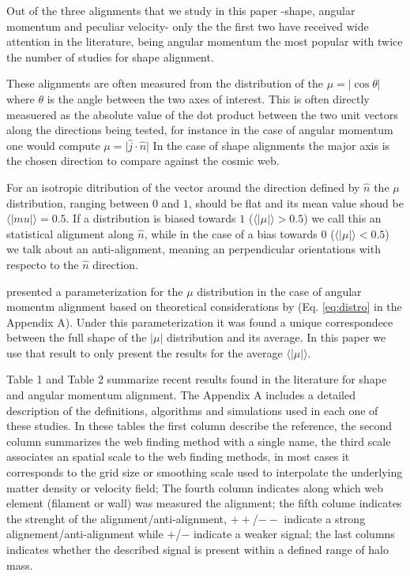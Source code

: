 \documentclass[useAMS,usenatbib]{mn2e}
\begin{document}
Out of the three alignments that we study in this paper -shape,
angular momentum and peculiar velocity- only the the first two have
received wide attention in the literature, being angular momentum the
most popular with twice the number of studies for shape alignment.

These alignments are often measured from the distribution of the
$\mu=\vert\cos\theta\vert$ where $\theta$ is the angle between the two axes of
interest. This is often directly measuered as the absolute value of
the dot product between the two unit vectors along the directions
being tested, for instance in the case of angular momentum one would compute
$\mu=\vert\hat{j}\cdot\hat{n}\vert$ In the case of shape alignments the major
axis is the chosen direction to compare against the cosmic web. 

For an isotropic ditribution of the vector around the direction defined by
$\hat{n}$ the $\mu$ distribution, ranging between $0$ and $1$, should
be flat and its mean value shoud be
$\langle|mu|\rangle=0.5$. If a distribution is biased towards $1$
($\langle\vert\mu\vert\rangle>0.5$) we call this an statistical
alignment along $\hat{n}$, while in the case of a bias towards $0$
($\langle\vert\mu\vert\rangle<0.5$) we talk about an anti-alignment,
meaning an perpendicular orientations with respecto to the $\hat{n}$
direction. 

\cite{Trowland2013} presented a parameterization for the $\mu$
distribution in the case of angular momentm alignment based on
theoretical considerations by \cite{Lee2005} (Eq. \ref{eq:distro} in
the Appendix A). Under this parameterization it was found a unique
correspondece between the full shape of the $\vert\mu\vert$
distribution and its average. In this paper we use that result to only
present the results for the average $\langle\vert\mu\vert\rangle$. 

Table 1 and Table 2 summarize recent results found in the literature for
shape and angular momentum alignment. The Appendix A includes a detailed
description of the definitions, algorithms and simulations used in
each one of these studies. In these tables the first column describe
the reference, the second column summarizes the web finding method
with a single name, the third scale associates an spatial scale to the
web finding methods, in most cases it corresponds to the grid size or
smoothing scale used to interpolate the underlying matter density or
velocity field; The fourth column indicates along which web element
(filament or wall) was measured the alignment; the fifth colume
indicates the strenght of the alignment/anti-alignment, $++$/$--$
indicate a strong alignement/anti-alignment while $+$/$-$ indicate a
weaker signal; the last columns indicates whether the described signal
is present within a defined range of halo mass.
\end{document}

